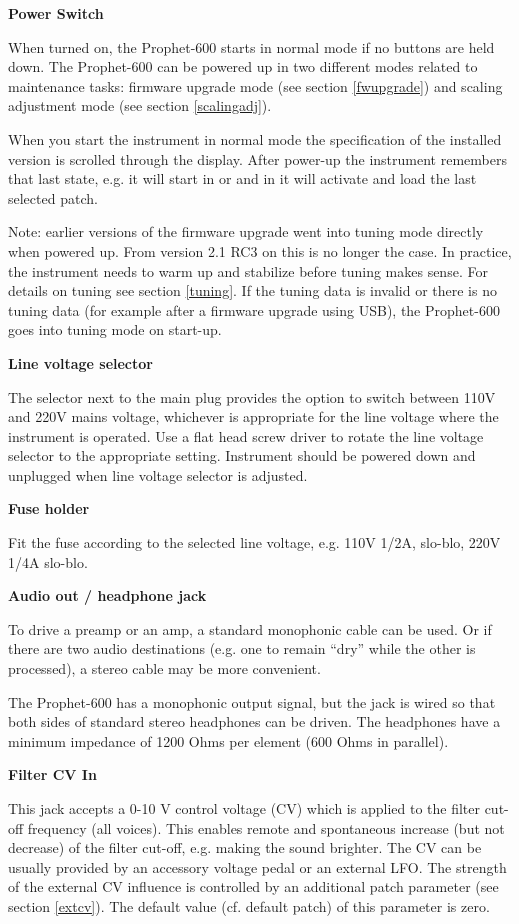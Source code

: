 \textbf{Power Switch}

When turned on, the Prophet-600 starts in normal mode if no buttons are held down. The Prophet-600 can be powered up in two different modes related to maintenance tasks: firmware upgrade mode (see section \ref{fwupgrade}) and scaling adjustment mode (see section \ref{scalingadj}).  

When you start the instrument in normal mode the specification of the installed version is scrolled through the display. After power-up the instrument remembers that last state, e.g. it will start in \livemode or \presetmode and in \presetmode it will activate and load the last selected patch.

Note: earlier versions of the firmware upgrade went into tuning mode directly when powered up. From version 2.1 RC3 on this is no longer the case. In practice, the instrument needs to warm up and stabilize before tuning makes sense. For details on tuning see section \ref{tuning}. If the tuning data is invalid or there is no tuning data (for example after a firmware upgrade using USB), the Prophet-600 goes into tuning mode on start-up.

\textbf{Line voltage selector}

The selector next to the main plug provides the option to switch between 110V and 220V mains voltage, whichever is appropriate for the line voltage where the instrument is operated. Use a flat head screw driver to rotate the line voltage selector to the appropriate setting. Instrument should be powered down and unplugged when line voltage selector is adjusted.

\textbf{Fuse holder}

Fit the fuse according to the selected line voltage, e.g. 110V 1/2A, slo-blo, 220V 1/4A slo-blo.

\textbf{Audio out / headphone jack}

To drive a preamp or an amp, a standard monophonic cable can be used. Or if there are two audio destinations (e.g. one to remain “dry” while the other is processed), a stereo cable may be more convenient.

The Prophet-600 has a monophonic output signal, but the jack is wired so that both sides of standard stereo headphones can be driven. The headphones have a minimum impedance of 1200 Ohms per element (600 Ohms in parallel).

\textbf{Filter CV In}

This jack accepts a 0-10 V control voltage (CV) which is applied to the filter cut-off frequency (all voices). This enables remote and spontaneous increase (but not decrease) of the filter cut-off, e.g. making the sound brighter. The CV can be usually provided by an accessory voltage pedal or an external LFO. The strength of the external CV influence is controlled by an additional patch parameter (see section \ref{extcv}). The default value (cf. default patch) of this parameter is zero. 

